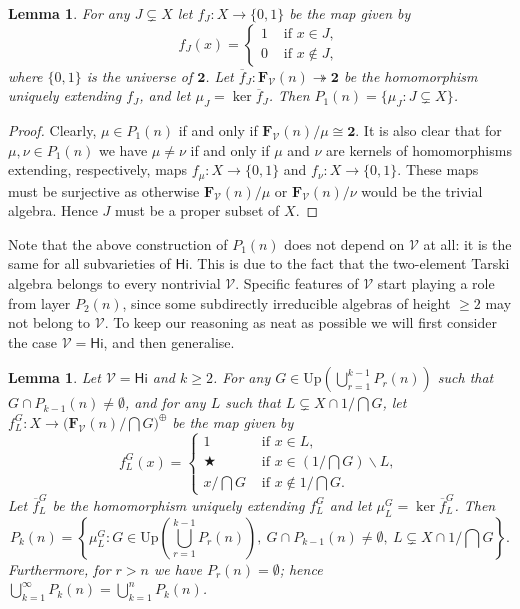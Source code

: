 \documentclass{amsart}
\newtheorem{lemma}[theorem]{Lemma}
\newcommand{\alg}[1]{\mathbf{#1}}
\newcommand{\var}[1]{\mathsf{#1}}
\newcommand{\ov}[1]{\overline{#1}}
\newcommand{\FV}{\alg{F}_\mathcal{V}}
\def\op{\bigstar}
\begin{document}
\begin{lemma}\label{lem:P1}
For any $J\subsetneq X$ let
$f_J\colon X\to\{0,1\}$ be the map given by
$$
f_J(x) =\begin{cases}
  1 & \text{ if } x\in J,\\
  0 & \text{ if } x\notin J,
\end{cases}
$$
where $\{0,1\}$ is the universe of $\alg{2}$.
Let $\ov{f}_J\colon \FV(n)\twoheadrightarrow \mathbf{2}$
be the homomorphism uniquely extending $f_J$, and let
$\mu_J = \ker \ov{f}_J$. Then
$P_1(n) = \{\mu_J: J\subsetneq X\}$.
\end{lemma}  
  
\begin{proof}
Clearly, $\mu\in P_1(n)$ if and only if
$\FV(n)/\mu \cong \alg{2}$. It is also clear that
for $\mu,\nu\in P_1(n)$ we have $\mu\neq\nu$ if and only if
$\mu$ and $\nu$ are kernels of homomorphisms
extending, respectively, maps $f_\mu\colon X\to \{0,1\}$ and
$f_\nu\colon X\to \{0,1\}$. These maps must be surjective as otherwise
$\FV(n)/\mu$ or $\FV(n)/\nu$ would be the trivial algebra. Hence
$J$ must be a proper subset of $X$. 
\end{proof}

Note that the above construction of $P_1(n)$ does not depend on $\mathcal{V}$
at all: it is the same for all subvarieties of $\var{Hi}$. This is due to the
fact that the two-element Tarski algebra belongs to every nontrivial
$\mathcal{V}$. Specific features of $\mathcal{V}$ 
start playing a role from layer $P_2(n)$,
since some subdirectly irreducible algebras of height
$\geq 2$ may not belong to $\mathcal{V}$. To keep our reasoning as neat as
possible we will first consider the case $\mathcal{V} = \var{Hi}$, and then
generalise. 


\begin{lemma}\label{lem:layers}
Let $\mathcal{V} = \var{Hi}$ and $k\geq 2$.
For any $G\in \mathrm{Up}\left(\bigcup_{r=1}^{k-1}P_r(n)\right)$
such that $G\cap P_{k-1}(n)\neq \emptyset$, and for any $L$ such that
$L\subsetneq X\cap 1/\bigcap G$,
let $f^G_L\colon X \to  \bigl(\FV(n)/\bigcap G\bigr)^\oplus$ be the map
given by 
$$
f^G_L(x) =\begin{cases}
  1 & \text{ if } x\in L,\\
  \op & \text{ if } x\in \left(1/\bigcap G\right)\smallsetminus L,\\
  x/\bigcap G & \text{ if } x\notin 1/\bigcap G.
\end{cases} 
$$
Let $\ov{f}^G_L$ be the homomorphism uniquely extending $f^G_L$ and
let $\mu^G_L = \ker\ov{f}^G_L$. Then
$$
P_k(n) =
\left\{\mu^G_L: G\in \mathrm{Up}\left(\bigcup_{r=1}^{k-1}P_r(n)\right),\ 
G\cap P_{k-1}(n)\neq \emptyset, \
L\subsetneq X\cap 1/\bigcap G  
\right\}.
$$
Furthermore, for $r>n$ we have $P_r(n) = \emptyset$; hence
$\bigcup_{k=1}^\infty P_k(n) = \bigcup_{k=1}^{n} P_k(n)$.
\end{lemma}  
\end{document}
